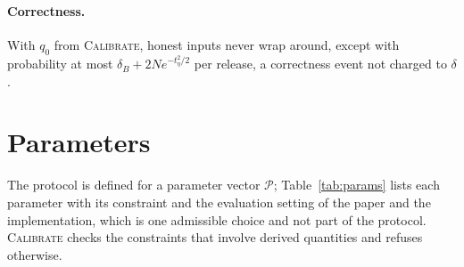 \documentclass[11pt]{article}
\theoremstyle{definition}
\theoremstyle{plain}
\begin{document}
\paragraph{Correctness.} With $q_0$ from \textsc{Calibrate}, honest inputs never wrap around, except with probability at most $\delta_B+2Ne^{-t_\eta^2/2}$ per release, a correctness event not charged to $\delta$.

\section{Parameters}
\label{sec:params}

The protocol is defined for a parameter vector $\mathcal P$; Table~\ref{tab:params} lists each parameter with its constraint and the evaluation setting of the paper and the implementation, which is one admissible choice and not part of the protocol. \textsc{Calibrate} checks the constraints that involve derived quantities and refuses otherwise.
\end{document}
